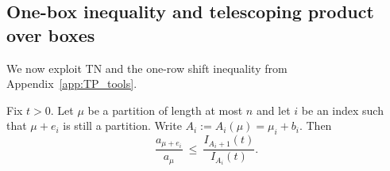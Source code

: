\subsection{One-box inequality and telescoping product over boxes}
\label{subsec:A1_Sp_one_box}

We now exploit TN and the one-row shift inequality from Appendix~\ref{app:TP_tools}.

\begin{lemma}
\label{lem:Sp_one_box}
Fix $t>0$.
Let $\mu$ be a partition of length at most $n$ and let $i$ be an index such that $\mu+e_i$ is still a partition.
Write $A_i:=A_i(\mu)=\mu_i+b_i$.
Then
\begin{equation}
\label{eq:Sp_one_box_bound}
\frac{a_{\mu+e_i}}{a_{\mu}}\ \le\ \frac{I_{A_i+1}(t)}{I_{A_i}(t)}.
\end{equation}
\end{lemma}

